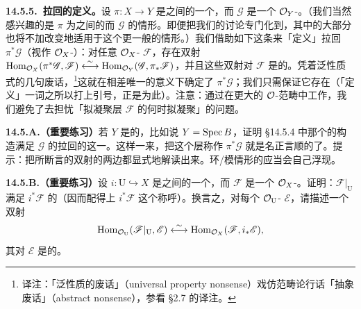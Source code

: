 \textbf{14.5.5.\ 拉回的\trUniversalProperty{}定义。}\quad 设 $\pi\colon X\to Y$ 是\trRingedSpace{}之间的一个\trMorphism，而 $\mathscr{G}$ 是一个 $\mathcal{O}_Y$-\trModule。（我们当然感兴趣的是 $\pi$ 为\trScheme{}之间的\trMorphism{}而 $\mathscr{G}$ \trQC{}的情形。即便把我们的讨论专门化到\trScheme，其中的大部分也将不加改变地适用于这个更一般的情形。）我们借助如下这条\trAdjointness\trUniversalProperty{}来「定义」拉回 $\pi^*\mathscr{G}$（视作 $\mathcal{O}_X$-\trModule）：对任意 $\mathcal{O}_X$-\trModule{} $\mathscr{F}$，存在双射 $\operatorname{Hom}_{\mathcal{O}_X}(\pi^*\mathscr{G},\mathscr{F})\overset{\sim}{\longleftrightarrow}\operatorname{Hom}_{\mathcal{O}_Y}(\mathscr{G},\pi_*\mathscr{F})$，并且这些双射对 $\mathscr{F}$ 是\trFunctoriality{}的。凭着泛性质式的几句废话，\footnote{译注：「泛性质的废话」（universal property nonsense）戏仿范畴论行话「抽象废话」（abstract nonsense），参看 \S2.7 的译注。}这就在相差唯一\trIsomorphism{}的意义下确定了 $\pi^*\mathscr{G}$；我们只需保证它存在（「定义」一词之所以打上引号，正是为此）。注意：通过在更大的 $\mathcal{O}$-\trModule{}范畴中工作，我们避免了去担忧「拟凝聚层 $\mathscr{F}$ 的\trPushforward{}何时拟凝聚」的问题。

\textbf{14.5.A.（重要练习）}\quad 若 $Y$ 是\trAffine{}的，比如说 $Y=\operatorname{Spec} B$，证明 \S14.5.4 中那个\trQCSheaf{}的构造满足 $\mathscr{G}$ 的拉回的这一\trUniversalProperty。这样一来，把这个层称作 $\pi^*\mathscr{G}$ 就是名正言顺的了。提示：把所断言的双射的两边都显式地解读出来。环/模情形的\trAdjointness{}应当会自己浮现。

\textbf{14.5.B.（重要练习）}\quad 设 $i\colon\mathrm{U}\hookrightarrow X$ 是\trRingedSpace{}之间的一个\trOpenEmbedding，而 $\mathscr{F}$ 是一个 $\mathcal{O}_X$-\trModule。证明：$\mathscr{F}\vert_{\mathrm{U}}$ 满足 $i^*\mathscr{F}$ 的\trUniversalProperty（因而配得上 $i^*\mathscr{F}$ 这个称呼）。换言之，对每个 $\mathcal{O}_{\mathrm{U}}$-\trModule{} $\mathscr{E}$，请描述一个双射
\[
\operatorname{Hom}_{\mathcal{O}_{\mathrm{U}}}(\mathscr{F}\vert_{\mathrm{U}},\mathscr{E})\overset{\sim}{\longleftrightarrow}\operatorname{Hom}_{\mathcal{O}_X}(\mathscr{F},i_*\mathscr{E}),
\]
其对 $\mathscr{E}$ 是\trFunctoriality{}的。

